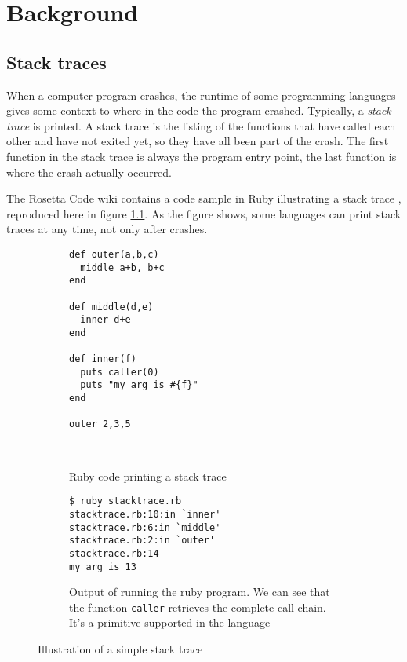 \chapter{Background}


\section{Stack traces}

When a computer program crashes, the runtime of some programming languages
gives some context to where in the code the program crashed.
Typically, a \emph{stack trace} is printed. A stack trace is the listing
of the functions that have called each other and have not exited yet, so
they have all been part of the crash. The first function in the stack
trace is always the program entry point, the last function is where the
crash actually occurred.

The Rosetta Code wiki contains a code sample in Ruby illustrating a stack
trace \cite{rosetta_stone_st}, reproduced here in figure
\ref{fig:ruby_stack_trace}. As the figure shows, some languages can print stack
traces at any time, not only after crashes.

\begin{figure}
\begin{mdframed}
  \begin{subfigure}[t]{0.5\textwidth}
      \begin{verbatim}
def outer(a,b,c)
  middle a+b, b+c
end

def middle(d,e)
  inner d+e
end

def inner(f)
  puts caller(0)
  puts "my arg is #{f}"
end

outer 2,3,5
       \end{verbatim}
    \caption{Ruby code printing a stack trace}
    ~ %
  \end{subfigure}
        \begin{subfigure}[t]{0.5\textwidth}
          \begin{verbatim}
$ ruby stacktrace.rb
stacktrace.rb:10:in `inner'
stacktrace.rb:6:in `middle'
stacktrace.rb:2:in `outer'
stacktrace.rb:14
my arg is 13
          \end{verbatim}
          \caption{Output of running the ruby program. We can see that the
            function \texttt{caller} retrieves the complete call chain. It's
            a primitive supported in the language}
        \end{subfigure}
        \caption{Illustration of a simple stack trace
        }\label{fig:ruby_stack_trace}
\end{mdframed}
\end{figure}

